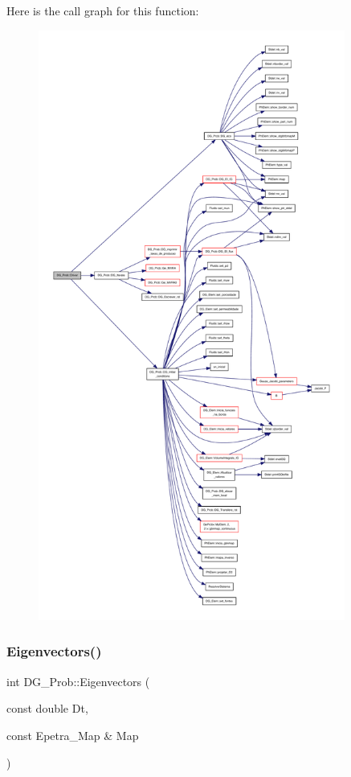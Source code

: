 Here is the call graph for this function\+:
\nopagebreak
\begin{figure}[H]
\begin{center}
\leavevmode
\includegraphics[height=550pt]{classDG__Prob_a015d792341ee05b1b3eaef7990bf1e06_cgraph}
\end{center}
\end{figure}
\mbox{\label{classDG__Prob_a23d58d1583859acafd9a6d5888424374}} 
\subsubsection{\texorpdfstring{Eigenvectors()}{Eigenvectors()}}
{\footnotesize\ttfamily int D\+G\+\_\+\+Prob\+::\+Eigenvectors (\begin{DoxyParamCaption}\item[{const double}]{Dt,  }\item[{const Epetra\+\_\+\+Map \&}]{Map }\end{DoxyParamCaption})}



